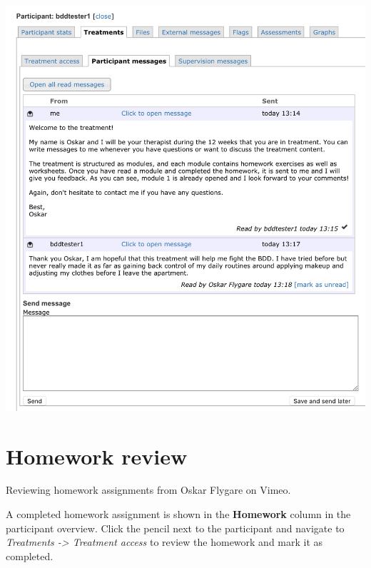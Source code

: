 \documentclass[]{book}
\begin{document}
\includegraphics{images/therapist-messages.png}

\hypertarget{homework-review}{%
\section{Homework review}\label{homework-review}}

Reviewing homework assignments from Oskar Flygare on Vimeo.

A completed homework assignment is shown in the \textbf{Homework} column in the participant overview. Click the pencil next to the participant and navigate to \emph{Treatments -\textgreater{} Treatment access} to review the homework and mark it as completed.
\end{document}
